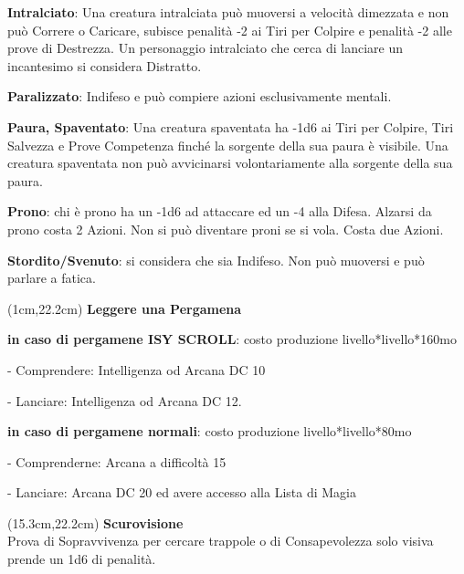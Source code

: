\documentclass[a4paper,12 pt,openany]{book}
\begin{document}
\begin{textblock*}{19 cm}
\begin{multicols}{2}
\textbf{Intralciato}: Una creatura intralciata può muoversi a velocità dimezzata e non può Correre o Caricare, subisce penalità -2 ai Tiri per Colpire e penalità -2 alle prove di Destrezza. Un personaggio intralciato che cerca di lanciare un incantesimo si considera Distratto.

\textbf{Paralizzato}:  Indifeso e può compiere azioni esclusivamente mentali.

\textbf{Paura, Spaventato}: Una creatura spaventata ha -1d6 ai Tiri per Colpire, Tiri Salvezza e Prove Competenza finché la sorgente della sua paura è visibile. Una creatura spaventata non può avvicinarsi volontariamente alla sorgente della sua paura.

\textbf{Prono}: chi è prono ha un -1d6 ad attaccare ed un -4 alla Difesa. Alzarsi da prono costa 2 Azioni. Non si può diventare proni se si vola. Costa due Azioni.

\textbf{Stordito/Svenuto}: si considera che sia Indifeso. Non può muoversi e può parlare a fatica.

\end{multicols}

\end{textblock*}


\begin{textblock*}{14 cm}(1cm,22.2cm)
\textbf{Leggere una Pergamena}

\textbf{in caso di pergamene ISY SCROLL}: costo produzione livello*livello*160mo

- Comprendere: Intelligenza od Arcana DC 10

- Lanciare: Intelligenza od Arcana DC 12.

\textbf{in caso di pergamene normali}: costo produzione livello*livello*80mo

- Comprenderne: Arcana a difficoltà 15

- Lanciare: Arcana DC 20 ed avere accesso alla Lista di Magia
\end{textblock*}


\begin{textblock*}{4.7cm}(15.3cm,22.2cm)
\textbf{Scurovisione}\\
Prova di Sopravvivenza per cercare trappole o di Consapevolezza solo visiva prende un 1d6 di penalità.
\end{textblock*}
\end{document}
